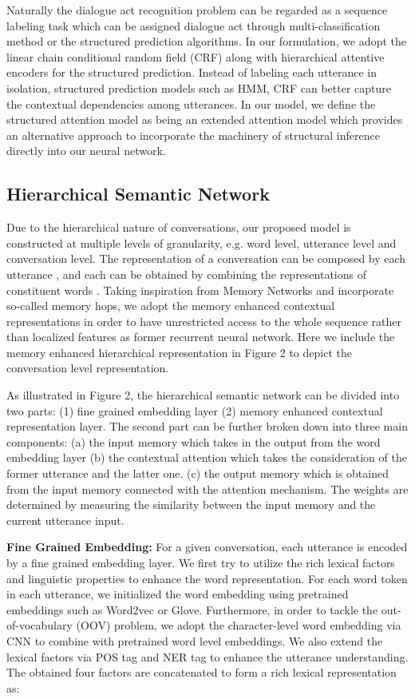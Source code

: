 \documentclass[sigconf]{acmart}
\begin{document}
Naturally the dialogue act recognition problem can be regarded as a sequence labeling task which can be assigned dialogue act through multi-classification method or the structured prediction algorithms. In our formulation, we adopt the linear chain conditional random field (CRF) along with hierarchical attentive encoders for the structured prediction. Instead of labeling each utterance in isolation, structured prediction models such as HMM, CRF can better capture the contextual dependencies among utterances. In our model, we define the structured attention model as being an extended attention model which provides an alternative approach to incorporate the machinery of structural inference directly into our neural network. 

\subsection{Hierarchical Semantic Network}
Due to the hierarchical nature of conversations, our proposed model is constructed at multiple levels of granularity, e.g. word level, utterance level and conversation level. The representation of a conversation can be composed by each utterance , and each  can be obtained by combining the representations of constituent words . Taking inspiration from Memory Networks and incorporate so-called memory hops, we adopt the memory enhanced contextual representations in order to have unrestricted access to the whole sequence rather than localized features as former recurrent neural network. Here we include the memory enhanced hierarchical representation in Figure 2 to depict the conversation level representation.

As illustrated in Figure 2, the hierarchical semantic network can be divided into two parts: (1) fine grained embedding layer (2) memory enhanced contextual representation layer. The second part can be further broken down into three main components: (a) the input memory  which takes in the output from the  word embedding layer (b) the contextual attention which takes the consideration of the former utterance and the latter one. (c) the output memory  which is obtained from the input memory connected with the attention mechanism. The weights are determined by measuring the similarity between the input memory and the current utterance input. 

\noindent \textbf{Fine Grained Embedding: } For a given conversation, each utterance  is encoded by a fine grained embedding layer. We first try to utilize the rich lexical factors and linguistic properties to enhance the word representation. For each word token  in each utterance, we initialized the word embedding using pretrained embeddings such as Word2vec or Glove. Furthermore, in order to tackle the out-of-vocabulary (OOV) problem, we adopt the character-level word embedding via CNN to combine with pretrained word level embeddings. We also extend the lexical factors via POS tag and NER tag to enhance the utterance understanding. The obtained four factors are concatenated to form a rich lexical representation as:
\end{document}

